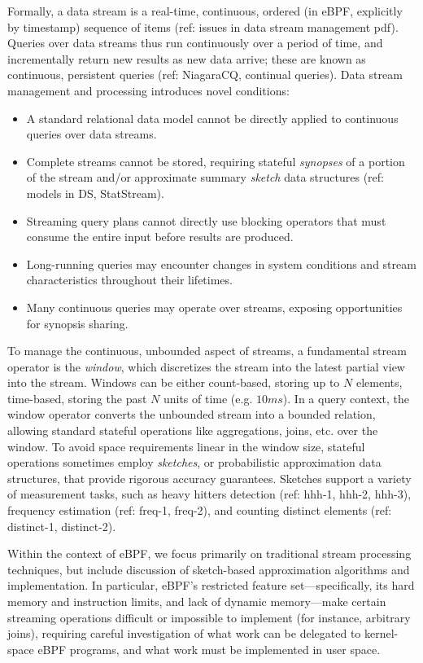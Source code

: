 Formally, a data stream is a real-time, continuous, ordered (in eBPF, explicitly by timestamp)
sequence of items (ref: issues in data stream management pdf). Queries over data streams thus run
continuously over a period of time, and incrementally return new results as new data arrive; these
are known as continuous, persistent queries (ref: NiagaraCQ, continual queries). Data stream
management and processing introduces novel conditions:
\begin{itemize}
    \item A standard relational data model cannot be directly applied to continuous queries over
        data streams.
    \item Complete streams cannot be stored, requiring stateful \textit{synopses} of a portion of
        the stream and/or approximate summary \textit{sketch} data structures (ref: models in DS,
        StatStream).
    \item Streaming query plans cannot directly use blocking operators that must consume the entire
        input before results are produced.
    \item Long-running queries may encounter changes in system conditions and stream characteristics
        throughout their lifetimes.
    \item Many continuous queries may operate over streams, exposing opportunities for synopsis
        sharing.
\end{itemize}

To manage the continuous, unbounded aspect of streams, a fundamental stream operator is the
\textit{window}, which discretizes the stream into the latest partial view into the stream. Windows
can be either count-based, storing up to $N$ elements, time-based, storing the past $N$ units of
time (e.g. $10ms$). In a query context, the window operator converts the unbounded stream into a
bounded relation, allowing standard stateful operations like aggregations, joins, etc. over the
window. To avoid space requirements linear in the window size, stateful operations sometimes employ
\textit{sketches}, or probabilistic approximation data structures, that provide rigorous accuracy
guarantees. Sketches support a variety of measurement tasks, such as heavy hitters detection (ref:
hhh-1, hhh-2, hhh-3), frequency estimation (ref: freq-1, freq-2), and counting distinct elements
(ref: distinct-1, distinct-2).

Within the context of eBPF, we focus primarily on traditional stream processing techniques, but
include discussion of sketch-based approximation algorithms and implementation. In particular,
eBPF's restricted feature set---specifically, its hard memory and instruction limits, and lack of
dynamic memory---make certain streaming operations difficult or impossible to implement (for
instance, arbitrary joins), requiring careful investigation of what work can be delegated to
kernel-space eBPF programs, and what work must be implemented in user space.

